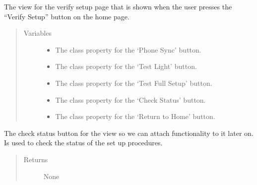 \documentclass[letterpaper,10pt,english]{sphinxmanual}
\begin{document}
\begin{fulllineitems}
\label{\detokenize{index:src.Views.View_VerifySetupScreen.VerifySetupWindow}}
The view for the verify setup page that is shown when the user presses the “Verify Setup” button on the home page.
\begin{quote}\begin{description}
\item[{Variables}] \leavevmode\begin{itemize}
\item {} 
 \textendash{} The class property for the ‘Phone Sync’ button.

\item {} 
 \textendash{} The class property for the ‘Test Light’ button.

\item {} 
 \textendash{} The class property for the ‘Test Full Setup’ button.

\item {} 
 \textendash{} The class property for the ‘Check Status’ button.

\item {} 
 \textendash{} The class property for the ‘Return to Home’ button.

\end{itemize}

\end{description}\end{quote}

\begin{fulllineitems}
\label{\detokenize{index:src.Views.View_VerifySetupScreen.VerifySetupWindow.BtnCheck}}
The check status button for the view so we can attach functionality to it later on.
Is used to check the status of the set up procedures.
\begin{quote}\begin{description}
\item[{Returns}] \leavevmode
None


\end{description}
\end{quote}
\end{fulllineitems}
\end{fulllineitems}
\end{document}
